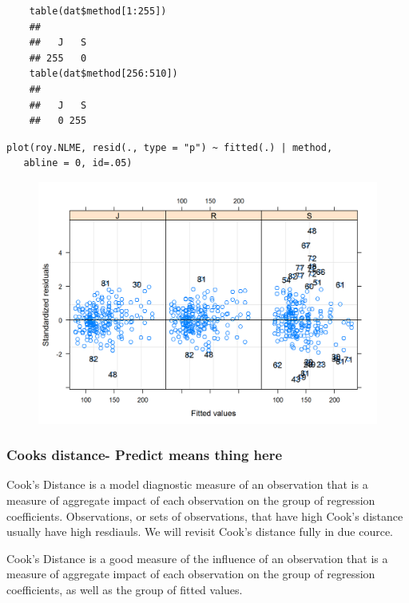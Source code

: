 \documentclass[Main.tex]{subfiles}
\begin{document}
\begin{framed}
	\begin{verbatim}
	table(dat$method[1:255])
	## 
	##   J   S 
	## 255   0
	table(dat$method[256:510])
	## 
	##   J   S 
	##   0 255
	\end{verbatim}	
\end{framed}
\newpage
\begin{framed}
\begin{verbatim}
plot(roy.NLME, resid(., type = "p") ~ fitted(.) | method, 
   abline = 0, id=.05)
\end{verbatim}
\end{framed}
\begin{figure}
\centering
\includegraphics[width=0.9\linewidth]{images/bloodnlmeResidPlot2}
\caption{}
\label{fig:blood}
\end{figure}


\subsubsection{Cooks distance- Predict means thing here}
Cook's Distance is a model diagnostic measure of an observation that is a measure of aggregate impact of each observation on the group of regression coefficients. Observations, or sets of observations, that have high Cook's distance usually have high resdiauls. We will revisit Cook's distance fully in due cource.

Cook's Distance is a good measure of the influence of an observation that is a measure of aggregate impact of each observation on the group of regression coefficients, as well as the group of fitted values.
\end{document}

